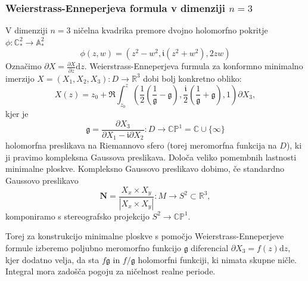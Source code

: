 \documentclass[8pt]{beamer}
\theoremstyle{definition}
\theoremstyle{remark}
\theoremstyle{plain}
\numberwithin{equation}{section}  %
\begin{document}
\begin{frame}
    \frametitle{Weierstrass-Enneperjeva formula v dimenziji $n=3$}

    V dimenziji $n=3$ ničelna kvadrika premore dvojno holomorfno pokritje $\phi: \mathbb{C}_*^2 \rightarrow \mathbb{A}_*^2$
    \begin{equation*}
        \phi(z, w)=\left(z^2-w^2, \mathfrak{i}\left(z^2+w^2\right), 2 z w\right)
    \end{equation*}
    Označimo $\partial X=\frac{\partial X}{\partial z} \mathrm{d} z$. Weierstrass-Enneperjeva furmula za konformno minimalno imerzijo $X=\left(X_1, X_2, X_3\right): D \rightarrow \mathbb{R}^3$ dobi bolj konkretno obliko:
    \begin{equation*}
        X(z)=z_0+\Re \int_{z_0}^z\left(\frac{1}{2}\left(\frac{1}{\mathfrak{g}}-\mathfrak{g}\right), \frac{\mathfrak{i}}{2}\left(\frac{1}{\mathfrak{g}}+\mathfrak{g}\right), 1\right) \partial X_3, 
    \end{equation*}
    kjer je 
    \begin{equation*}
        \mathfrak{g}=\frac{\partial X_3}{\partial X_1-\mathfrak{i} \partial X_2}: D \longrightarrow \mathbb{C P}^1 = \mathbb{C}\cup \{\infty \}
    \end{equation*}
    holomorfna preslikava na Riemannovo sfero (torej meromorfna funkcija na $D$), ki ji pravimo \textcolor{red1}{kompleksna Gaussova preslikava}. Določa veliko pomembnih lastnosti minimalne ploskve. Kompleksno Gaussovo preslikavo dobimo, če standardno Gaussovo preslikavo 
    \begin{equation*}
        \mathbf{N}=\frac{X_x \times X_y}{\left|X_x \times X_y\right|}: M \rightarrow S^2 \subset \mathbb{R}^3,
    \end{equation*}
    komponiramo s stereografsko projekcijo $S^2 \rightarrow \mathbb{CP}^1$. 

    \vspace{0.8em}

    Torej za konstrukcijo minimalne ploskve s pomočjo Weierstrass-Enneperjeve formule izberemo poljubno meromorfno funkcijo $\mathfrak{g}$ diferencial $\partial X_3 = f(z) \mathrm{d}z$, kjer dodatno velja, da sta $f \mathfrak{g}$ in $f /\mathfrak{g}$ holomorfni funkciji, ki nimata skupne ničle. Integral mora zadošča pogoju za ničelnost realne periode. 

    
\end{frame}
\end{document}

